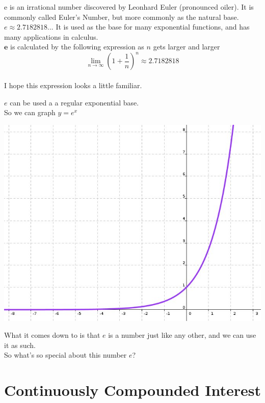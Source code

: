 \documentclass[12pt]{article}
\begin{document}
e is an irrational number discovered by Leonhard Euler (pronounced oiler). It is commonly called Euler’s Number, but more commonly as the natural base. $e\approx 2.7182818...$ It is used as the base for many exponential functions, and has many applications in calculus.\\

$\mathbf{e}$ is calculated by the following expression as $n$ gets larger and larger $$\lim_{n \to \infty} \left(1+\frac{1}{n}\right)^n \approx 2.7182818$$\\

I hope this expression looks a little familiar.

\hrulefill

$e$ can be used a a regular exponential base. \\

So we can graph $y=e^x$\\

\begin{center}
\includegraphics[scale=.75]{e.jpg}
\end{center}

What it comes down to is that $e$ is a number just like any other, and we can use it as such.\\

So what's so special about this number $e$?

\pagebreak

\section{Continuously Compounded Interest}
\end{document}
